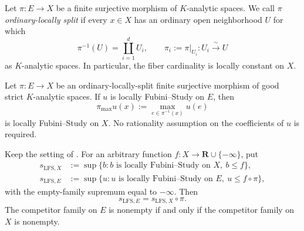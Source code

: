 
\begin{definition}
\label{def:p031-ordinary-locally-split}
Let $\pi:E\to X$ be a finite surjective morphism of $K$-analytic spaces.
We call $\pi$ \emph{ordinary-locally split} if every $x\in X$ has an
ordinary open neighborhood $U$ for which
\begin{equation}
\label{eq:p031-ordinary-local-splitting}
 \pi^{-1}(U)=\coprod_{i=1}^{d}U_i,
 \qquad
 \pi_i:=\pi|_{U_i}:U_i\xrightarrow{\ \sim\ }U
\end{equation}
as $K$-analytic spaces.  In particular, the fiber cardinality is locally
constant on $X$.
\end{definition}

\begin{theorem}
\label{thm:p031-lfs-fiber-maximum}
Let $\pi:E\to X$ be an ordinary-locally-split finite surjective morphism
of good strict $K$-analytic spaces.  If $u$ is locally Fubini--Study on
$E$, then
\begin{equation}
\label{eq:p031-lfs-fiber-maximum}
             \pi_{\max}u(x):=\max_{e\in\pi^{-1}(x)}u(e)
\end{equation}
is locally Fubini--Study on $X$.  No rationality assumption on the
coefficients of $u$ is required.
\end{theorem}

\begin{theorem}
\label{thm:p031-lfs-envelope-pullback}
Keep the setting of .  For an arbitrary
function $f:X\to\mathbf R\cup\{-\infty\}$, put
\begin{align*}
 s_{\mathrm{LFS},X}
   &:=\sup\{b:b\text{ is locally Fubini--Study on }X,\ b\leq f\},\\
 s_{\mathrm{LFS},E}
   &:=\sup\{u:u\text{ is locally Fubini--Study on }E,
                    \ u\leq f\circ\pi\},
\end{align*}
with the empty-family supremum equal to $-\infty$.  Then
\begin{equation}
\label{eq:p031-lfs-envelope-pullback}
               s_{\mathrm{LFS},E}=s_{\mathrm{LFS},X}\circ\pi.
\end{equation}
The competitor family on $E$ is nonempty if and only if the competitor
family on $X$ is nonempty.
\end{theorem}
